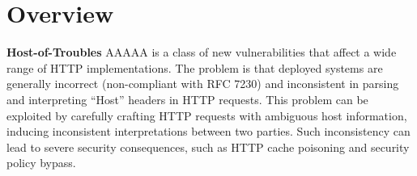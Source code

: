 \section{Overview}
\textbf{Host-of-Troubles} AAAAA is a class of new vulnerabilities that affect a wide range of HTTP implementations. The problem is that deployed systems are generally incorrect (non-compliant with RFC 7230) and inconsistent in parsing and interpreting “Host” headers in HTTP requests. This problem can be exploited by carefully crafting HTTP requests with ambiguous host information, inducing inconsistent interpretations between two parties. Such inconsistency can lead to severe security consequences, such as HTTP cache poisoning and security policy bypass.